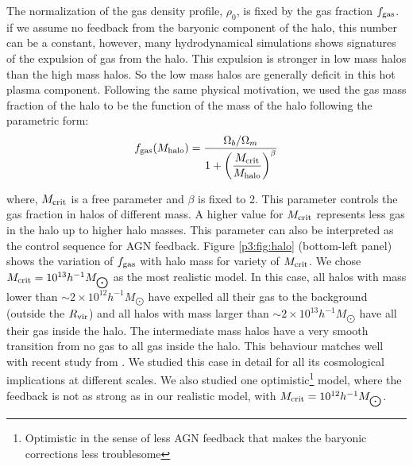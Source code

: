 \documentclass[
  11pt,
  twoside,
  openright,
  titlepage,
  headings=optiontoheadandtoc
]{scrbook}
\begin{document}
The normalization of the gas density profile, $\rho_0$, is fixed by the gas fraction $f_{\rm{gas}}$. if we assume no feedback from the baryonic component of the halo, this number can be a constant, however, many hydrodynamical simulations \citep{2005MNRAS.356..107R, 2005MNRAS.360..892D, 2006Natur.442..539M, 2012MNRAS.421.3464P, 2013MNRAS.429.3068T, 2013MNRAS.432.1947M} shows signatures of the expulsion of gas from the halo. This expulsion is stronger in low mass halos than the high mass halos. So the low mass halos are generally deficit in this hot plasma component. Following the same physical motivation, we used the gas mass fraction of the halo to be the function of the mass of the halo following the parametric form:
\begin{equation}
	f_{\rm{gas}}(M_{\rm halo}) =  \dfrac{\Omega_b/\Omega_m}{1 + \left (\dfrac{M_{\rm{crit}}}{M_{\rm{halo}}} \right) ^{\beta}}
\end{equation}

where, $M_{\rm{crit}}$ is a free parameter and $\beta$ is fixed to 2. This parameter controls the gas fraction in halos of different mass. A higher value for $M_{\rm{crit}}$ represents less gas in the halo up to higher halo masses. This parameter can also be interpreted as the control sequence for AGN feedback. Figure \ref{p3:fig:halo} (bottom-left panel) shows the variation of $f_{\rm{gas}}$ with halo mass for variety of $M_{\rm{crit}}$. We chose $M_{\rm crit} = 10^{13} h^{-1} M_{\bigodot}$ as the most realistic model. In this case, all halos with mass lower than $\sim 2\times 10^{12} h^{-1} M_{\bigodot}$ have expelled all their gas to the background (outside the $R_{\rm vir}$) and all halos with mass larger than $\sim 2\times 10^{13} h^{-1} M_{\bigodot}$ have all their gas inside the halo. The intermediate mass halos have a very smooth transition from no gas to all gas inside the halo. This behaviour matches well with recent study from \cite{2014arXiv1409.8617S}. We studied this case in detail for all its cosmological implications at different scales. We also studied one optimistic\footnote{Optimistic in the sense of less AGN feedback that makes the baryonic corrections less troublesome} model, where the feedback is not as strong as in our realistic model, with $M_{\rm crit} = 10^{12} h^{-1} M_{\bigodot}$.


\end{document}
